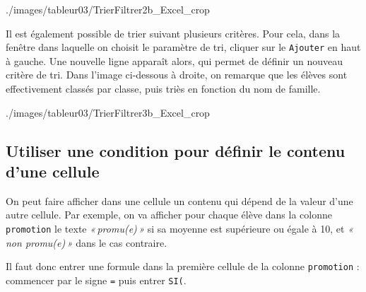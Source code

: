 %
{./images/tableur03/TrierFiltrer2b_Excel_crop}{\textwidth}

Il est également possible de trier suivant plusieurs critères. Pour cela, dans la fenêtre dans laquelle on choisit le paramètre de tri, cliquer sur le \texttt{Ajouter} en haut à gauche. Une nouvelle ligne apparaît alors, qui permet de définir un nouveau critère de tri. Dans l'image ci-dessous à droite, on remarque que les élèves sont effectivement classés par classe, puis triès en fonction du nom de famille.

%
{./images/tableur03/TrierFiltrer3b_Excel_crop}{\textwidth}













\subsection{Utiliser une condition pour définir le contenu d'une cellule}\label{Calc3Condition}

On peut faire afficher dans une cellule un contenu qui dépend de la valeur d'une autre cellule. Par exemple, on va afficher pour chaque élève dans la colonne \texttt{promotion} le texte \emph{«\,promu(e)\,»} si sa moyenne est supérieure ou égale à 10, et \emph{«\,non promu(e)\,»} dans le cas contraire.

Il faut donc entrer une formule dans la première cellule de la colonne \texttt{promotion} : commencer par le signe \texttt{=} puis entrer \texttt{SI(}.


